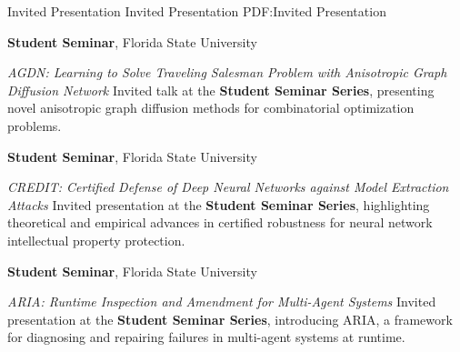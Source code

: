 \Section
{Invited Presentation}
{Invited Presentation}
{PDF:Invited Presentation}

\Entry
\textbf{Student Seminar},
Florida State University

\Gap
\BulletItem
\textit{AGDN: Learning to Solve Traveling Salesman Problem with Anisotropic Graph Diffusion Network}
\newline
Invited talk at the \textbf{Student Seminar Series}, presenting novel anisotropic graph diffusion methods for combinatorial optimization problems.

\BigGap
\Entry
\textbf{Student Seminar},
Florida State University

\Gap
\BulletItem
\textit{CREDIT: Certified Defense of Deep Neural Networks against Model Extraction Attacks}
\hfill
{}
\newline
Invited presentation at the \textbf{Student Seminar Series}, highlighting theoretical and empirical advances in certified robustness for neural network intellectual property protection.

\BigGap
\Entry
\textbf{Student Seminar},
Florida State University

\Gap
\BulletItem
\textit{ARIA: Runtime Inspection and Amendment for Multi-Agent Systems}
\hfill
{}
\newline
Invited presentation at the \textbf{Student Seminar Series}, introducing ARIA, a framework for diagnosing and repairing failures in multi-agent systems at runtime.
